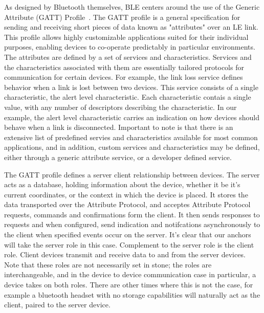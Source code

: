 \documentclass{sig-alternate}
\begin{document}
As designed by Bluetooth themselves, BLE centers around 
the use of the Generic Attribute (GATT) Profile~\cite{bluetooth_core}.  
The GATT profile is a general specification for sending and 
receiving short  pieces of data known as "attributes" over an LE link. 
This profile allows highly customizable applications suited for their 
individual purposes, enabling devices to co-operate predictably in 
particular environments. The attributes are defined by a set of 
services and characteristics. Services and the characteristics 
associated with them are essentially tailored protocols for 
communication for certain devices. For example, the link loss 
service defines behavior when a link is lost between two devices. 
This service consists of a single  characteristic, the alert level 
characteristic. Each characteristic contais a single value, with any 
number of descriptors describing the characteristic. In our example, 
the alert level characteristic carries an indication on how devices 
should behave when a link is disconnected. Important to note is 
that there is an extensive list of predefined servies and 
characteristics available for most common applications, and in 
addition, custom services and characteristics may be defined, 
either through a generic attribute service, or a developer defined 
service.

The GATT profile defines a server client relationship between
devices. The server acts as a database, holding information about
the device, whether it be it's current coordinates, or the context
in which the device is placed. It stores the data transported 
over the Attribute Protocol, and acceptes Attribute Protocol 
requests, commands and confirmations form the client. It then
sends responses to requests and when configured, send indication
and notifcations asynchronously to the client when specified 
events occur on the server.
It's clear that our anchors will take the server role in this case. 
Complement to the server role is the client role. Client devices 
transmit and receive data to and from the server devices. 
Note that these roles are not necessarily set in stone; the roles are 
interchangeable, and  in the device to device communication case 
in particular, a device takes on both roles. There are other times 
where this is not the case, for example a bluetooth headset with 
no storage capabilities will naturally act as the client, paired to the 
server device. 
\end{document}
